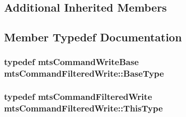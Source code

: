 \subsection*{Additional Inherited Members}


\subsection{Member Typedef Documentation}
\hypertarget{classmts_command_filtered_write_af0fe1d0192120a875d65d2ba14f665ef}{
\subsubsection[{Base\-Type}]{\setlength{\rightskip}{0pt plus 5cm}typedef {\bf mts\-Command\-Write\-Base} {\bf mts\-Command\-Filtered\-Write\-::\-Base\-Type}}}\label{classmts_command_filtered_write_af0fe1d0192120a875d65d2ba14f665ef}
\hypertarget{classmts_command_filtered_write_a397cd5406f1cf05ebdf94ec5050dbe20}{
\subsubsection[{This\-Type}]{\setlength{\rightskip}{0pt plus 5cm}typedef {\bf mts\-Command\-Filtered\-Write} {\bf mts\-Command\-Filtered\-Write\-::\-This\-Type}}}\label{classmts_command_filtered_write_a397cd5406f1cf05ebdf94ec5050dbe20}


